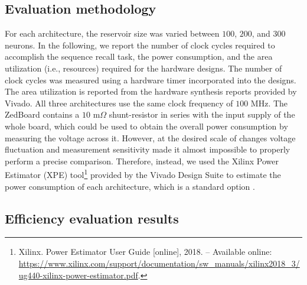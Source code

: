 \subsection{Evaluation methodology}


For each architecture, the reservoir size was varied between $100$, $200$, and $300$ neurons. 
In the following, we report the number of clock cycles required to accomplish the sequence recall task, the power consumption, and the area utilization (i.e., resources) required for the hardware designs.
The number of clock cycles was measured using a hardware timer incorporated into the designs. The area utilization is reported from the hardware synthesis reports provided by Vivado. 
All three architectures use the same clock frequency of $100$ MHz.
The ZedBoard contains a $10$ m$\Omega$ shunt-resistor in series with the input supply of the whole board, which could be used to obtain the overall power consumption by measuring the voltage across it. 
However, at the desired scale of changes voltage fluctuation and measurement sensitivity made it almost impossible to properly perform a precise comparison.
Therefore, instead, we used the Xilinx Power Estimator (XPE) tool\footnote{Xilinx. Power Estimator User Guide [online], 2018. -- Available online: \url{https://www.xilinx.com/support/documentation/sw_manuals/xilinx2018_3/ug440-xilinx-power-estimator.pdf}.} provided by the Vivado Design Suite to estimate the power consumption of each architecture, which is a standard option \cite{FPGASTDP2019, HACNN2018, XPEconf}.



\subsection{Efficiency evaluation results}

